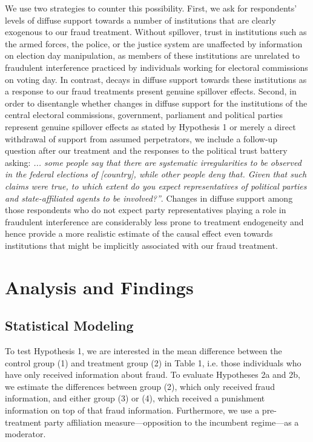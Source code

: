 \documentclass[11pt, ngerman,english,a4]{article}
\begin{document}
We use two strategies to counter this possibility. 
First, we ask for respondents' levels of diffuse support towards a number of institutions that are clearly exogenous to our fraud treatment. 
Without spillover, trust in institutions such as the armed forces, the police, or the justice system are unaffected by information on election day manipulation, as members of these institutions are unrelated to fraudulent interference practiced by individuals working for electoral commissions on voting day. 
In contrast, decays in diffuse support towards these institutions as a response to our fraud treatments present genuine spillover effects. 
Second, in order to disentangle whether changes in diffuse support for the institutions of the central electoral commissions, government, parliament and political parties represent genuine spillover effects as stated by Hypothesis 1 or merely a direct withdrawal of support from assumed perpetrators, we include a follow-up question after our treatment and the responses to the political trust battery asking: \textit{... some people say that there are systematic irregularities to be observed in the federal elections of [country], while other people deny that. 
Given that such claims were true, to which extent do you expect representatives of political parties and state-affiliated agents to be involved?”}. 
Changes in diffuse support among those respondents who do not expect party representatives playing a role in fraudulent interference are considerably less prone to treatment endogeneity and hence provide a more realistic estimate of the causal effect even towards institutions that might be implicitly associated with our fraud treatment. 

\section*{Analysis and Findings}

\subsection*{Statistical Modeling}

To test Hypothesis 1, we are interested in the mean difference between the control group (1) and treatment group (2) in Table 1, i.e. those individuals who have only received information about fraud.
To evaluate Hypotheses 2a and 2b, we estimate the differences between group (2), which only received fraud information, and either group (3) or (4), which received a punishment information on top of that fraud information. 
Furthermore, we use a pre-treatment party affiliation measure---opposition to the incumbent regime---as a moderator.
\end{document}
